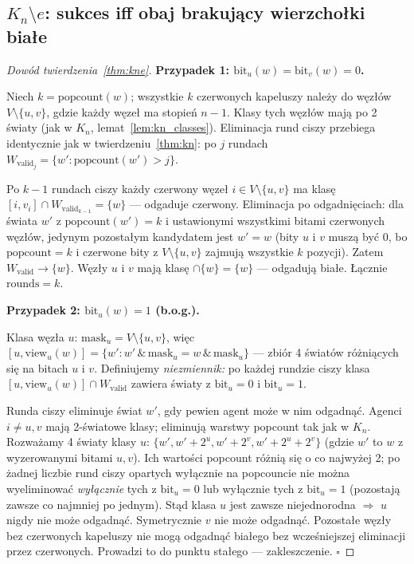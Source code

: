 \documentclass[12pt,a4paper]{article}
\theoremstyle{plain}
\theoremstyle{definition}
\theoremstyle{remark}
\newcommand{\rounds}{\mathrm{rounds}}
\newcommand{\popcount}{\mathrm{popcount}}
\newcommand{\view}{\mathrm{view}}
\newcommand{\mask}{\mathrm{mask}}
\newcommand{\Wval}{W_{\mathrm{valid}}}
\begin{document}
\subsection{$K_n \setminus e$: sukces iff obaj brakujący wierzchołki białe}
\label{sec:proof_kne}

\begin{proof}[Dowód twierdzenia~\ref{thm:kne}]

\textbf{Przypadek 1: $\mathrm{bit}_u(w) = \mathrm{bit}_v(w) = 0$.}

Niech $k = \popcount(w)$; wszystkie $k$ czerwonych kapeluszy należy do węzłów $V \setminus \{u,v\}$, gdzie każdy węzeł ma stopień $n-1$. Klasy tych węzłów mają po 2 światy (jak w $K_n$, lemat~\ref{lem:kn_classes}). Eliminacja rund ciszy przebiega identycznie jak w twierdzeniu~\ref{thm:kn}: po $j$ rundach $\Wval_j = \{w' : \popcount(w') > j\}$.

Po $k-1$ rundach ciszy każdy czerwony węzeł $i \in V \setminus \{u,v\}$ ma klasę $[i,v_i] \cap \Wval_{k-1} = \{w\}$ — odgaduje czerwony. Eliminacja po odgadnięciach: dla świata $w'$ z $\popcount(w') = k$ i ustawionymi wszystkimi bitami czerwonych węzłów, jedynym pozostałym kandydatem jest $w' = w$ (bity $u$ i $v$ muszą być 0, bo $\popcount = k$ i czerwone bity z $V\setminus\{u,v\}$ zajmują wszystkie $k$ pozycji). Zatem $\Wval \to \{w\}$. Węzły $u$ i $v$ mają klasę $\cap \{w\} = \{w\}$ — odgadują białe. Łącznie $\rounds = k$.

\textbf{Przypadek 2: $\mathrm{bit}_u(w) = 1$ (b.o.g.).}

Klasa węzła $u$: $\mask_u = V \setminus \{u,v\}$, więc $[u, \view_u(w)] = \{w' : w' \,\&\, \mask_u = w \,\&\, \mask_u\}$ — zbiór 4 światów różniących się na bitach $u$ i $v$. Definiujemy \emph{niezmiennik:} po każdej rundzie ciszy klasa $[u, \view_u(w)] \cap \Wval$ zawiera światy z $\mathrm{bit}_u = 0$ i $\mathrm{bit}_u = 1$.

Runda ciszy eliminuje świat $w'$, gdy pewien agent może w nim odgadnąć. Agenci $i \ne u,v$ mają 2-światowe klasy; eliminują warstwy popcount tak jak w $K_n$. Rozważamy 4 światy klasy $u$: $\{w', w'+2^u, w'+2^v, w'+2^u+2^v\}$ (gdzie $w'$ to $w$ z wyzerowanymi bitami $u,v$). Ich wartości popcount różnią się o co najwyżej 2; po żadnej liczbie rund ciszy opartych wyłącznie na popcouncie nie można wyeliminować \emph{wyłącznie} tych z $\mathrm{bit}_u = 0$ lub wyłącznie tych z $\mathrm{bit}_u = 1$ (pozostają zawsze co najmniej po jednym). Stąd klasa $u$ jest zawsze niejednorodna $\Rightarrow$ $u$ nigdy nie może odgadnąć. Symetrycznie $v$ nie może odgadnąć. Pozostałe węzły bez czerwonych kapeluszy nie mogą odgadnąć białego bez wcześniejszej eliminacji przez czerwonych. Prowadzi to do punktu stałego — zakleszczenie. $\square$
\end{proof}
\end{document}

